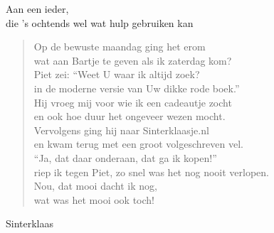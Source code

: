 \documentclass[12pt]{brief}
\date{4 december 2004}
\begin{document}
\begin{letter}{Aan een ieder,\\
die 's ochtends wel wat hulp gebruiken kan}

\opening{}


\begin{verse}

Op de bewuste maandag ging het erom\\
wat aan Bartje te geven als ik zaterdag kom?\\[0.5em]

Piet zei: ``Weet U waar ik altijd zoek?\\
in de moderne versie van Uw dikke rode boek.''\\[0.5em]

Hij vroeg mij voor wie ik een cadeautje zocht\\
en ook hoe duur het ongeveer wezen mocht.\\[0.5em]

Vervolgens ging hij naar Sinterklaasje.nl\\
en kwam terug met een groot volgeschreven vel.\\[0.5em]

``Ja, dat daar onderaan, dat ga ik kopen!''\\
riep ik tegen Piet, zo snel was het nog nooit verlopen.\\[2em]


Nou, dat mooi dacht ik nog,\\
wat was het mooi ook toch!\\[0.5em]

\end{verse}


Sinterklaas


\closing{}

\end{letter}
\end{document}
